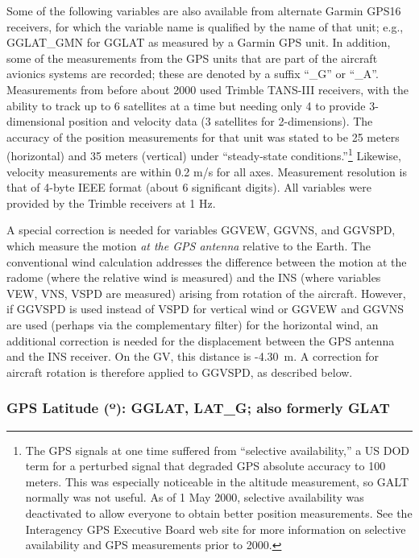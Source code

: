 \documentclass[
]{book}
\begin{document}
Some of the following variables are also available from alternate Garmin GPS16 receivers, for which the variable name is qualified by the name of that unit; e.g., GGLAT\_GMN for GGLAT as measured by a Garmin GPS unit. In addition, some of the measurements from the GPS units that are part of the aircraft avionics systems are recorded; these are denoted by a suffix ``\_G'' or ``\_A''. Measurements from before about 2000 used Trimble TANS-III receivers, with the ability to track up to 6 satellites at a time but needing only 4 to provide 3-dimensional position and velocity data (3 satellites for 2-dimensions). The accuracy of the position measurements for that unit was stated to be 25 meters (horizontal) and 35 meters (vertical) under ``steady-state conditions.''\footnote{The GPS signals at one time suffered from ``selective availability,'' a US DOD term for a perturbed signal that degraded GPS absolute accuracy to 100 meters. This was especially noticeable in the altitude measurement, so GALT normally was not useful. As of 1 May 2000, selective availability was deactivated to allow everyone to obtain better position measurements. See the Interagency GPS Executive Board web site for more information on selective availability and GPS measurements prior to 2000.}
Likewise, velocity measurements are within 0.2 m/s for all axes. Measurement resolution is that of 4-byte IEEE format (about 6 significant digits). All variables were provided by the Trimble receivers at 1 Hz.

A special correction is needed for variables GGVEW, GGVNS, and GGVSPD, which measure the motion \emph{at the GPS antenna} relative to the Earth. The conventional wind calculation addresses the difference between the motion at the radome (where the relative wind is measured) and the INS (where variables VEW, VNS, VSPD are measured) arising from rotation of the aircraft. However, if GGVSPD is used instead of VSPD for vertical wind or GGVEW and GGVNS are used (perhaps via the complementary filter) for the horizontal wind, an additional correction is needed for the displacement between the GPS antenna and the INS receiver. On the GV, this distance is -4.30~m. A correction for aircraft rotation is therefore applied to GGVSPD, as described below.

\hypertarget{gglat}{%
\subsubsection*{\texorpdfstring{GPS Latitude ({º}): GGLAT, LAT\_G; also formerly GLAT}{GPS Latitude (º): GGLAT, LAT\_G; also formerly GLAT}}\label{gglat}}
\end{document}
